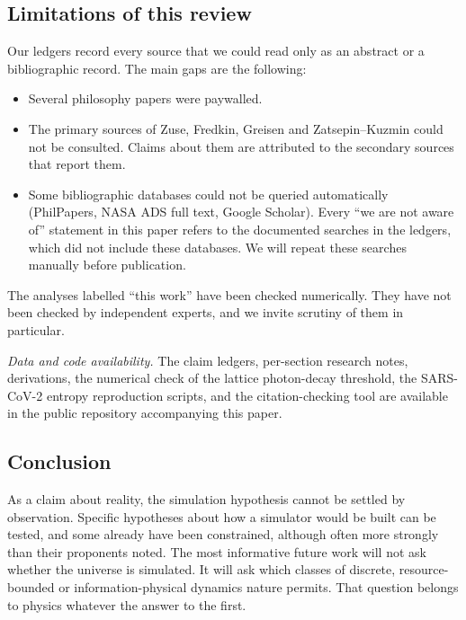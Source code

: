 \subsection{Limitations of this review}
\label{sec:discussion:limitations}

Our ledgers record every source that we could read only as an abstract or a bibliographic record. The main gaps are the following:
\begin{itemize}
\item Several philosophy papers were paywalled.
\item The primary sources of Zuse, Fredkin, Greisen and Zatsepin--Kuzmin could not be consulted. Claims about them are attributed to the secondary sources that report them.
\item Some bibliographic databases could not be queried automatically (PhilPapers, NASA ADS full text, Google Scholar). Every ``we are not aware of'' statement in this paper refers to the documented searches in the ledgers, which did not include these databases. We will repeat these searches manually before publication.
\end{itemize}
The analyses labelled ``this work'' have been checked numerically. They have not been checked by independent experts, and we invite scrutiny of them in particular.

\emph{Data and code availability.} The claim ledgers, per-section research notes, derivations, the numerical check of the lattice photon-decay threshold, the SARS-CoV-2 entropy reproduction scripts, and the citation-checking tool are available in the public repository accompanying this paper.

\subsection{Conclusion}

As a claim about reality, the simulation hypothesis cannot be settled by observation. Specific hypotheses about how a simulator would be built can be tested, and some already have been constrained, although often more strongly than their proponents noted. The most informative future work will not ask whether the universe is simulated. It will ask which classes of discrete, resource-bounded or information-physical dynamics nature permits. That question belongs to physics whatever the answer to the first.
